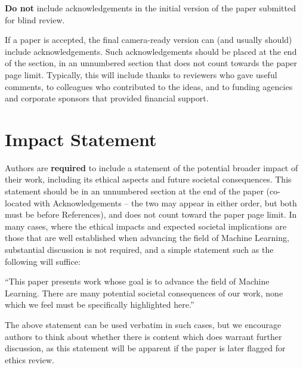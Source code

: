 \documentclass{article}
\theoremstyle{plain}
\theoremstyle{definition}
\theoremstyle{remark}
\begin{document}
\textbf{Do not} include acknowledgements in the initial version of the paper
submitted for blind review.

If a paper is accepted, the final camera-ready version can (and usually should)
include acknowledgements.  Such acknowledgements should be placed at the end of
the section, in an unnumbered section that does not count towards the paper
page limit. Typically, this will include thanks to reviewers who gave useful
comments, to colleagues who contributed to the ideas, and to funding agencies
and corporate sponsors that provided financial support.

\section*{Impact Statement}

Authors are \textbf{required} to include a statement of the potential broader
impact of their work, including its ethical aspects and future societal
consequences. This statement should be in an unnumbered section at the end of
the paper (co-located with Acknowledgements -- the two may appear in either
order, but both must be before References), and does not count toward the paper
page limit. In many cases, where the ethical impacts and expected societal
implications are those that are well established when advancing the field of
Machine Learning, substantial discussion is not required, and a simple
statement such as the following will suffice:

``This paper presents work whose goal is to advance the field of Machine
Learning. There are many potential societal consequences of our work, none
which we feel must be specifically highlighted here.''

The above statement can be used verbatim in such cases, but we encourage
authors to think about whether there is content which does warrant further
discussion, as this statement will be apparent if the paper is later flagged
for ethics review.

\nocite{langley00}




\newpage
\appendix
\onecolumn
\appendix
\end{document}
